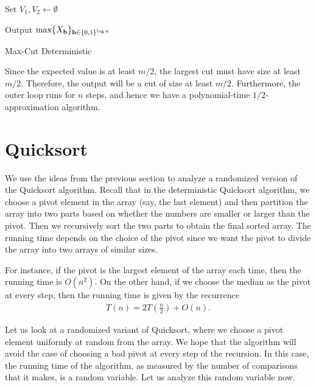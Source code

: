 \begin{algorithm}
	
	Set $V_1, V_2 \gets \emptyset$
	
	
	Output $\max \{X_{\mathbf{b}}\}_{\mathbf{b} \in \{0,1\}^{\log n}}$

	\caption{Max-Cut Deterministic}
	\label{alg:maxcut-det}
\end{algorithm}

Since the expected value is at least $m/2$, the largest cut must have size at least $m/2$. Therefore, the output will be a cut of size at least $m/2$. Furthermore, the outer loop runs for $n$ steps, and hence we have a polynomial-time $1/2$-approximation algorithm.

\section{Quicksort}
We use the ideas from the previous section to analyze a randomized version of the Quicksort algorithm. Recall that in the deterministic Quicksort algorithm, we choose a pivot element in the array (say, the last element) and then partition the array into two parts based on whether the numbers are smaller or larger than the pivot. Then we recursively sort the two parts to obtain the final sorted array. The running time depends on the choice of the pivot since we want the pivot to divide the array into two arrays of similar sizes. 

For instance, if the pivot is the largest element of the array each time, then the running time is $O(n^2)$. On the other hand, if we choose the median as the pivot at every step, then the running time is given by the recurrence
\begin{align*}
	T(n) = 2T\left( \frac{n}{2} \right) + O(n).
\end{align*}

Let us look at a randomized variant of Quicksort, where we choose a pivot element uniformly at random from the array. We hope that the algorithm will avoid the case of choosing a bad pivot at every step of the recursion. In this case, the running time of the algorithm, as measured by the number of comparisons that it makes, is a random variable. Let us analyze this random variable now.

